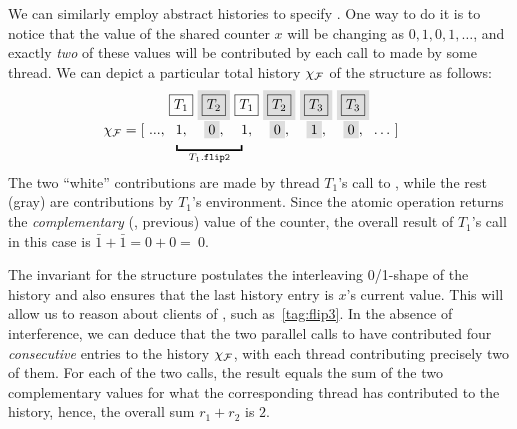 We can similarly employ abstract histories to specify
. One way to do it is to notice that the value of the
shared counter $x$ will be changing as $0, 1, 0, 1, \ldots$, and
exactly \emph{two} of these values will be contributed by each call to
 made by some thread. We can depict a particular total
history $\chi_{\cal F}$ of the  structure as follows:
%
\[
%
\!\!\!\!\!\!\!\!
%
\begin{array}{r@{\ }c@{\ }c@{\ }c@{\ }c@{\ }c@{\ }c@{\ }c@{\ }c@{\ }l@{\ }}
  & & \boxed{T_1} & \graybox{\boxed{T_2}} & {\boxed{T_1}} & \graybox{\boxed{T_2}} & \graybox{\boxed{T_3}}
  & \graybox{\boxed{T_3}} 
  \\[5pt] 
  \hist_{\cal F} = \text{[} & ..., & 1, & \graybox{0}, & 
                                 1, & \graybox{0}, &  \graybox{1}, & \graybox{0}, &
                                                                          \ldots
                     &
                       \text{]}   
\\[-5pt]
&& \multicolumn{3}{l}{{\underbracket{\phantom{aaaaaaaaa}}_{T_1.\mathtt{flip2}}}}
\end{array}
\]
%
The two ``white'' contributions are made by thread $T_1$'s call to
, while the rest (gray) are contributions by $T_1$'s
environment. Since the atomic  operation returns the
\emph{complementary} (\ie, previous) value of the counter, the overall
result of $T_1$'s call in this case is $\bar{1} + \bar{1} = 0 + 0
=~0$.

The invariant for the  structure postulates the
interleaving 0/1-shape of the history and also ensures that the last
history entry is $x$'s current value. This will allow us to reason
about clients of , such as~\eqref{tag:flip3}.
%
%
In the absence of interference, we can deduce that the two parallel
calls to  have contributed four \emph{consecutive} entries
to the history $\chi_{\cal F}$, with each thread contributing
precisely two of them. For each of the two calls, the result equals
the sum of the two complementary values for what the corresponding
thread has contributed to the history, hence, the overall sum
$r_1 + r_2$ is $2$.


